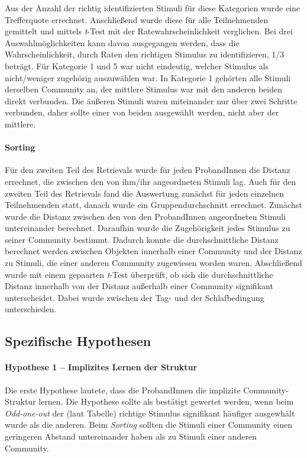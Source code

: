 Aus der Anzahl der richtig identifizierten Stimuli für diese Kategorien wurde eine Trefferquote errechnet. Anschließend wurde diese für alle Teilnehmenden gemittelt und mittels \textit{t}-Test mit der Ratewahrscheinlichkeit verglichen. Bei drei Auswahlmöglichkeiten kann davon ausgegangen werden, dass die Wahrscheinlichkeit, durch Raten den richtigen Stimulus zu identifizieren, 1/3 beträgt.
Für Kategorie 1 und 5 war nicht eindeutig, welcher Stimulus als nicht/weniger zugehörig auszuwählen war. In Kategorie 1 gehörten alle Stimuli derselben Community an, der mittlere Stimulus war mit den anderen beiden direkt verbunden. Die äußeren Stimuli waren miteinander nur über zwei Schritte verbunden, daher sollte einer von beiden ausgewählt werden, nicht aber der mittlere.


\paragraph{Sorting}
Für den zweiten Teil des Retrievals wurde für jeden ProbandInnen die Distanz errechnet, die zwischen den von ihm/ihr angeordneten Stimuli lag.
Auch für den zweiten Teil des Retrievals fand die Auswertung zunächst für jeden einzelnen Teilnehmenden statt, danach wurde ein Gruppendurchschnitt errechnet. Zunächst wurde die Distanz zwischen den von den ProbandInnen angeordneten Stimuli untereinander berechnet. Daraufhin wurde die Zugehörigkeit jedes Stimulus zu seiner Community bestimmt. Dadurch konnte die durchschnittliche Distanz berechnet werden zwischen Objekten innerhalb einer Community und der Distanz zu Stimuli, die einer anderen Community zugewiesen worden waren. Abschließend wurde mit einem gepaarten \textit{t}-Test überprüft, ob sich die durchschnittliche Distanz innerhalb von der Distanz außerhalb einer Community signifikant unterscheidet. Dabei wurde zwischen der Tag- und der Schlafbedingung unterschieden.

\subsection{Spezifische Hypothesen}

\paragraph{Hypothese 1 – Implizites Lernen der Struktur}
Die erste Hypothese lautete, dass die ProbandInnen die implizite Community-Struktur lernen.
Die Hypothese sollte als bestätigt gewertet werden, wenn beim \textit{Odd-one-out} der (laut Tabelle) richtige Stimulus signifikant häufiger ausgewhält wurde als die anderen. Beim \textit{Sorting} sollten die Stimuli einer Community einen geringeren Abstand untereinander haben als zu Stimuli einer anderen Community.

